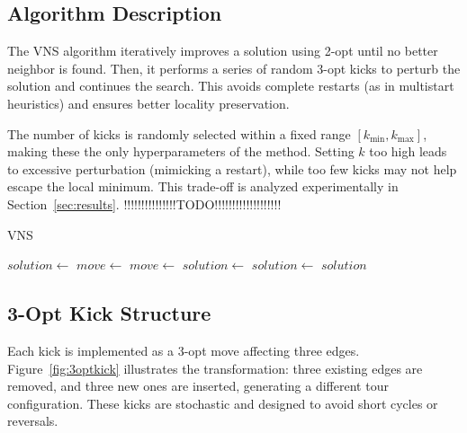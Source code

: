 \subsection{Algorithm Description}

The VNS algorithm iteratively improves a solution using 2-opt until no better neighbor is found. Then, it performs a series of random 3-opt kicks 
to perturb the solution and continues the search. This avoids complete restarts (as in multistart heuristics) and ensures better locality preservation.

The number of kicks is randomly selected within a fixed range $[k_{\text{min}}, k_{\text{max}}]$, making these the only hyperparameters of the method. 
Setting $k$ too high leads to excessive perturbation (mimicking a restart), while too few kicks may not help escape the local minimum. 
This trade-off is analyzed experimentally in Section~\ref{sec:results}. !!!!!!!!!!!!!!!TODO!!!!!!!!!!!!!!!!!!!

\begin{algorithm}
\caption{VNS}
\label{alg:vns}
\begin{algorithmic}
    \State $solution \gets$ 
        \State $move \gets$ 
                \State $move \gets$ 
                \State $solution \gets$ 
            \EndFor
        \Else
            \State $solution \gets$ 
        \EndIf
    \EndWhile
    \State \Return $solution$
\EndProcedure
\end{algorithmic}
\end{algorithm}

\subsection{3-Opt Kick Structure}

Each kick is implemented as a 3-opt move affecting three edges. Figure~\ref{fig:3optkick} illustrates the transformation: 
three existing edges are removed, and three new ones are inserted, generating a different tour configuration. These kicks are stochastic and 
designed to avoid short cycles or reversals.

